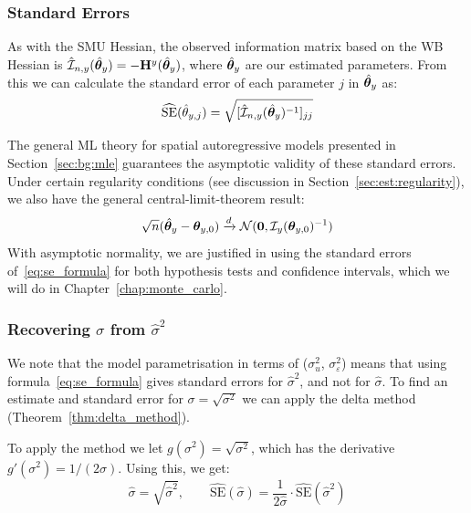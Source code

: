 \subsubsection{Standard Errors}

As with the SMU Hessian, the observed information matrix based on the WB Hessian is $\hat{\mathcal{I}}_{n,y}(\hat{\bm{\theta}}_y) = -\mathbf{H}^y(\hat{\bm{\theta}}_y)$, where $\hat{\bm{\theta}}_y$ are our estimated parameters. From this we can calculate the standard error of each parameter $j$ in $\hat{\bm{\theta}}_y$ as:
\begin{equation}
\label{eq:se_formula}
    \widehat{\text{SE}}(\hat\theta_{y,j}) = \sqrt{[\hat{\mathcal{I}}_{n,y}(\hat{\bm{\theta}}_y)^{-1}]_{jj}}
\end{equation}

The general ML theory for spatial autoregressive models \parencite[Thm.~3.2, p.~1906]{Lee2004} presented in Section~\ref{sec:bg:mle} guarantees the asymptotic validity of these standard errors. Under certain regularity conditions (see discussion in Section~\ref{sec:est:regularity}), we also have the general central-limit-theorem result:
\begin{equation}
    \sqrt{n}(\hat{\bm{\theta}}_y - \bm{\theta}_{y,0}) \xrightarrow{d} \mathcal{N}(\bm{0}, \mathcal{I}_y(\bm{\theta}_{y,0})^{-1})
\end{equation}
With asymptotic normality, we are justified in using the standard errors of~\eqref{eq:se_formula} for both hypothesis tests and confidence intervals, which we will do in Chapter~\ref{chap:monte_carlo}.

\subsubsection{Recovering $\sigma$ from $\hat\sigma^2$}

We note that the model parametrisation in terms of ($\sigma_u^2$, $\sigma_\varepsilon^2$) means that using formula~\eqref{eq:se_formula} gives standard errors for $\hat\sigma^2$, and not for $\hat\sigma$. To find an estimate and standard error for $\sigma = \sqrt{\sigma^2}$ we can apply the delta method (Theorem~\ref{thm:delta_method}).

To apply the method we let $g(\sigma^2) = \sqrt{\sigma^2}$, which has the derivative $g'(\sigma^2) = 1/(2\sigma)$. Using this, we get:
\begin{equation}
\label{eq:delta_method_sigma}
    \hat\sigma = \sqrt{\hat\sigma^2}, \qquad
    \widehat{\text{SE}}(\hat\sigma) = \frac{1}{2\hat\sigma} \cdot \widehat{\text{SE}}(\hat\sigma^2)
\end{equation}


